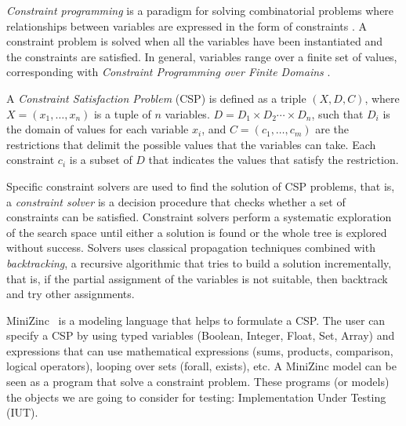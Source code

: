 \textit{Constraint programming} is a paradigm for solving combinatorial problems where relationships between variables are expressed in the form of constraints \citep{rbw06}.
A constraint problem is solved when all the variables have been instantiated and the constraints are satisfied. In general, variables range over a finite set of values, corresponding with \textit{Constraint Programming over Finite Domains} \cite{schulte2006finite}.


\begin{definition}
  A \textit{Constraint Satisfaction Problem}
  \citep{guns2017miningzinc} (CSP) is defined as a triple
  $( X, D, C)$, where $X=(x_{1},\dots ,x_{n})$ is a tuple of $n$
  variables.  $D=D_{1}\times D_{2}\cdots \times D_{n}$, such that
  $D_i$ is the domain of values for each variable $x_i$, and
  $C=(c_{1},\dots ,c_{m})$ are the restrictions that delimit the
  possible values that the variables can take.  Each constraint
  $c_{i}$ is a subset of $D$ that indicates the values that satisfy
  the restriction.
\end{definition}



Specific constraint solvers are used to find the solution of CSP problems, that is, a \textit{constraint solver} is a decision procedure that checks whether a set of constraints can be satisfied.
Constraint solvers perform a systematic exploration of the search space until either a solution is found or the whole tree is explored without success.
Solvers uses classical propagation techniques \citep{van89} combined with {\em backtracking},
a recursive algorithmic that tries to build a solution incrementally, that is, if the partial assignment of the variables is not suitable, then backtrack and try other assignments.


MiniZinc~\cite{DBLP:journals/constraints/MarriottNRSBW08} is a modeling
language that helps to formulate a CSP. The user can specify a CSP by
using typed variables (Boolean, Integer, Float, Set, Array) and
expressions that can use mathematical expressions (sums, products,
comparison, logical operators), looping over sets (forall, exists), etc.
A MiniZinc model can be seen as a program that solve a constraint
problem. These programs (or models) the objects we are going to
consider for testing: Implementation Under Testing (IUT).

